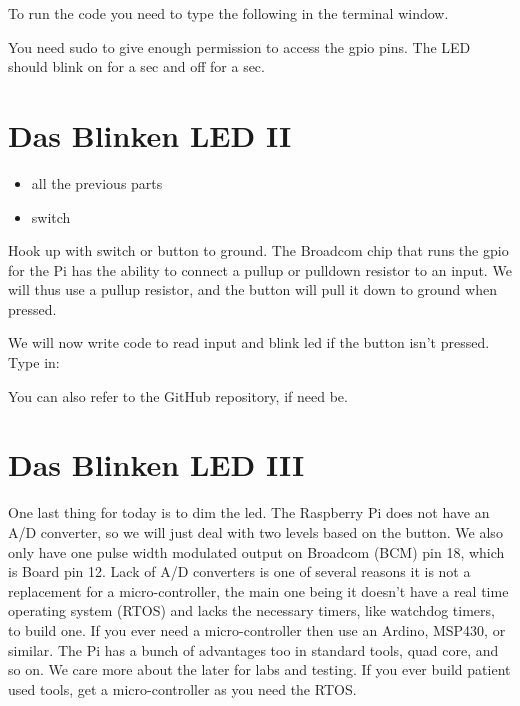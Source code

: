 
To run the code you need to type the following in the terminal window.


You need sudo to give enough permission to access the gpio pins.  The LED should blink on for a sec and off for a sec.

\section{Das Blinken LED II}

\begin{itemize}
  \item all the previous parts
  \item switch
\end{itemize}

Hook up with switch or button to ground.  The Broadcom chip that runs the gpio for the Pi has the ability to connect a pullup or pulldown resistor to an input.  We will thus use a pullup resistor, and the button will pull it down to ground when pressed.

We will now write code to read input and blink led if the button isn't pressed.  Type in:


You can also refer to the GitHub repository, if need be.




\section{Das Blinken LED III}

One last thing for today is to dim the led.  The Raspberry Pi does not have an A/D converter, so we will just deal with two levels based on the button.  We also only have one pulse width modulated output on Broadcom (BCM) pin 18, which is Board pin 12.  Lack of A/D converters is one of several reasons it is not a replacement for a micro-controller, the main one being it doesn't have a real time operating system (RTOS) and lacks the necessary timers, like watchdog timers, to build one.  If you ever need a micro-controller then use an Ardino, MSP430, or similar.  The Pi has a bunch of advantages too in standard tools, quad core, and so on.  We care more about the later for labs and testing.  If you ever build patient used tools, get a micro-controller as you need the RTOS.

